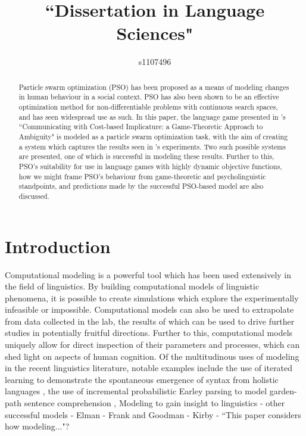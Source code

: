 \documentclass[12pt]{article}
\begin{document}
\title{``Dissertation in Language Sciences"}
\author{s1107496}

\maketitle

\begin{abstract}
Particle swarm optimization (PSO) has been proposed as a means of modeling changes in human behaviour in a social context. PSO has also been shown to be an effective optimization method for non-differentiable problems with continuous search spaces, and has seen widespread use as such. In this paper, the language game presented in \citeauthor{rohde2012}'s ``Communicating with Cost-based Implicature: a Game-Theoretic Approach to Ambiguity" is modeled as a particle swarm optimization task, with the aim of creating a system which captures the results seen in \citeauthor{rohde2012}'s experiments. Two such possible systems are presented, one of which is successful in modeling these results. Further to this, PSO's suitability for use in language games with highly dynamic objective functions, how we might frame PSO's behaviour from game-theoretic and psycholinguistic standpoints, and predictions made by the successful PSO-based model are also discussed.
\end{abstract}



\section{Introduction}
Computational modeling is a powerful tool which has been used extensively in the field of linguistics. By building computational models of linguistic phenomena, it is possible to create simulations which explore the experimentally infeasible or impossible. Computational models can also be used to extrapolate from data collected in the lab, the results of which can be used to drive further studies in potentially fruitful directions. Further to this, computational models uniquely allow for direct inspection of their parameters and processes, which can shed light on aspects of human cognition. Of the multitudinous uses of modeling in the recent linguistics literature, notable examples include the use of iterated learning to demonstrate the spontaneous emergence of syntax from holistic languages \citep{kirby2002}, the use of incremental probabilistic Earley parsing to model garden-path sentence comprehension \citep{hale2001}, 
Modeling to gain insight to linguistics - other successful models - Elman - Frank and Goodman - Kirby - ``This paper considers how modeling..."?
\end{document}
